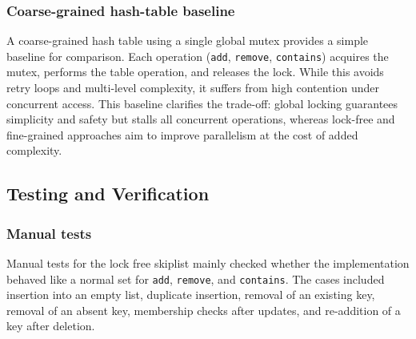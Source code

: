 \documentclass[11pt,a4paper]{article}
\begin{document}

\subsubsection{Coarse-grained hash-table baseline}
\label{sec:coarsegrain-impl}
A coarse-grained hash table using a single global mutex provides a simple baseline for comparison. Each operation (\texttt{add}, \texttt{remove}, \texttt{contains}) acquires the mutex, performs the table operation, and releases the lock. While this avoids retry loops and multi-level complexity, it suffers from high contention under concurrent access. This baseline clarifies the trade-off: global locking guarantees simplicity and safety but stalls all concurrent operations, whereas lock-free and fine-grained approaches aim to improve parallelism at the cost of added complexity.

\subsection{Testing and Verification}

\subsubsection{Manual tests}
\label{sec:manual-tests}

Manual tests for the lock free skiplist mainly checked whether the implementation behaved like a normal set for \texttt{add}, \texttt{remove}, and \texttt{contains}. The cases included insertion into an empty list, duplicate insertion, removal of an existing key, removal of an absent key, membership checks after updates, and re-addition of a key after deletion.
\end{document}
